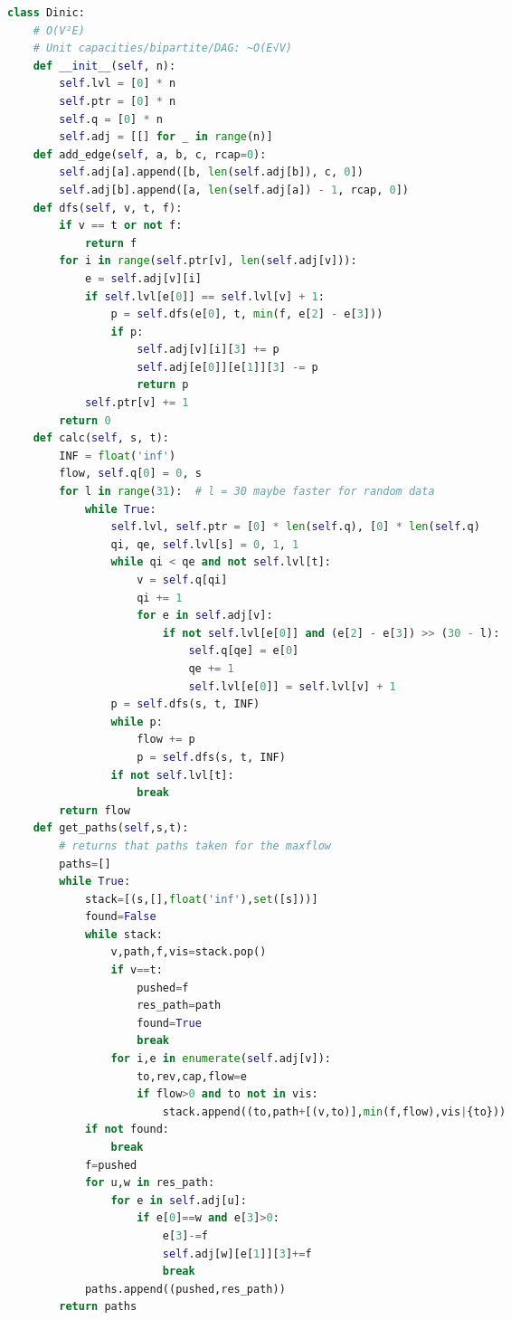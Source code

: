 \documentclass[10pt,landscape, a4paper]{article}
\begin{document}
\begin{multicols*}{3}
\begin{lstlisting}[language=Python]
class Dinic:
    # O(V²E)
    # Unit capacities/bipartite/DAG: ~O(E√V)
    def __init__(self, n):
        self.lvl = [0] * n
        self.ptr = [0] * n
        self.q = [0] * n
        self.adj = [[] for _ in range(n)]
    def add_edge(self, a, b, c, rcap=0):
        self.adj[a].append([b, len(self.adj[b]), c, 0])
        self.adj[b].append([a, len(self.adj[a]) - 1, rcap, 0])
    def dfs(self, v, t, f):
        if v == t or not f:
            return f
        for i in range(self.ptr[v], len(self.adj[v])):
            e = self.adj[v][i]
            if self.lvl[e[0]] == self.lvl[v] + 1:
                p = self.dfs(e[0], t, min(f, e[2] - e[3]))
                if p:
                    self.adj[v][i][3] += p
                    self.adj[e[0]][e[1]][3] -= p
                    return p
            self.ptr[v] += 1
        return 0
    def calc(self, s, t):
        INF = float('inf')
        flow, self.q[0] = 0, s
        for l in range(31):  # l = 30 maybe faster for random data
            while True:
                self.lvl, self.ptr = [0] * len(self.q), [0] * len(self.q)
                qi, qe, self.lvl[s] = 0, 1, 1
                while qi < qe and not self.lvl[t]:
                    v = self.q[qi]
                    qi += 1
                    for e in self.adj[v]:
                        if not self.lvl[e[0]] and (e[2] - e[3]) >> (30 - l):
                            self.q[qe] = e[0]
                            qe += 1
                            self.lvl[e[0]] = self.lvl[v] + 1
                p = self.dfs(s, t, INF)
                while p:
                    flow += p
                    p = self.dfs(s, t, INF)
                if not self.lvl[t]:
                    break
        return flow
    def get_paths(self,s,t):
        # returns that paths taken for the maxflow
        paths=[]
        while True:
            stack=[(s,[],float('inf'),set([s]))]
            found=False
            while stack:
                v,path,f,vis=stack.pop()
                if v==t:
                    pushed=f
                    res_path=path
                    found=True
                    break
                for i,e in enumerate(self.adj[v]):
                    to,rev,cap,flow=e
                    if flow>0 and to not in vis:
                        stack.append((to,path+[(v,to)],min(f,flow),vis|{to}))
            if not found:
                break
            f=pushed
            for u,w in res_path:
                for e in self.adj[u]:
                    if e[0]==w and e[3]>0:
                        e[3]-=f
                        self.adj[w][e[1]][3]+=f
                        break
            paths.append((pushed,res_path))
        return paths
\end{lstlisting}


\end{multicols*}
\end{document}
